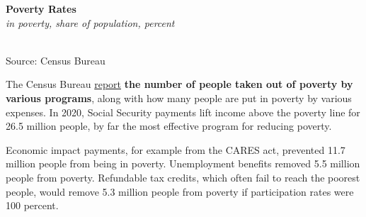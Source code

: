 \documentclass{report}
\makeatletter
\newcommand{\tbllink}[1]{\href{https://raw.githubusercontent.com/bdecon/US-chartbook/master/chartbook/data/#1}{\faTable}}
\newcommand*\short[1]{\expandafter\@gobbletwo\number\numexpr#1\relax}
\newcommand{\absnode}[3]{\node[below right, align=left] at (axis cs: #1,#2) {#3};}
\newcommand{\dateaxisticks}{
		date coordinates in=x, axis line style={draw=none},
		xmax={2023-02-15},
		max space between ticks=40,	    
		xtick={{1990-01-01}, {1992-01-01}, {1994-01-01}, 
			{1996-01-01}, {1998-01-01}, {2000-01-01}, 
			{2002-01-01}, {2004-01-01}, {2006-01-01},
			{2008-01-01}, {2010-01-01}, {2012-01-01}, {2014-01-01},
		    {2016-01-01}, {2018-01-01}, {2020-01-01}, {2022-01-01}, 
		    {2024-01-01}, {2026-01-01}},
		minor xtick={{1989-01-01}, {1991-01-01}, {1993-01-01},
			{1995-01-01}, {1997-01-01}, {1999-01-01}, 
			{2001-01-01}, {2003-01-01}, {2005-01-01}, {2007-01-01},
		    {2009-01-01}, {2011-01-01}, {2013-01-01}, {2015-01-01},
		    {2017-01-01}, {2019-01-01}, {2021-01-01}, {2023-01-01}, 
		    {2025-01-01}, {2027-01-01}},
		enlarge y limits={0.06}, enlarge x limits={0.01},
		}
\newcommand{\bbar}[2]{extra #1 ticks = {{#2}}, extra #1 tick labels = ,
		extra #1 tick style = {grid=major, grid style={thick, black!25}},}
\newcommand{\thickline}[4]{\addplot[ultra thick, no markers, color=#1] 
		table [x=#2, y=#3, col sep=comma] {#4};	}
\newcommand{\rbars}{
		\fill[color=black!10] (axis cs:{1990-07-01},\pgfkeysvalueof{/pgfplots/ymin}) rectangle 
			(axis cs:{1991-03-01}, \pgfkeysvalueof{/pgfplots/ymax});
		\fill[color=black!10] (axis cs:{2007-12-01},\pgfkeysvalueof{/pgfplots/ymin}) rectangle 
			(axis cs:{2009-07-01}, \pgfkeysvalueof{/pgfplots/ymax});
		\fill[color=black!10] (axis cs:{2001-03-01},\pgfkeysvalueof{/pgfplots/ymin}) rectangle 
			(axis cs:{2001-11-01}, \pgfkeysvalueof{/pgfplots/ymax});
		\fill[color=black!10] (axis cs:{2020-02-01},\pgfkeysvalueof{/pgfplots/ymin}) rectangle 
			(axis cs:{2020-05-01}, \pgfkeysvalueof{/pgfplots/ymax});}
\makeatother
\begin{document}
{\begin{minipage}{0.76\textwidth}
\small 
\vspace{1mm}

\normalsize \textbf{Poverty Rates}\\
\footnotesize{\textit{in poverty, share of population, percent}}\\
\hspace*{-2mm} \\
\footnotesize{Source: Census Bureau} \hfill \tbllink{poverty_opm_line.csv}
\end{minipage}
\newpage
\begin{minipage}{0.76\textwidth}
\small The Census Bureau \href{https://www.census.gov/library/publications/2021/demo/p60-275.html}{report} \textbf{the number of people taken out of poverty by various programs}, along with how many people are put in poverty by various expenses. In 2020, Social Security payments lift income above the poverty line for 26.5 million people, by far the most effective program for reducing poverty.

Economic impact payments, for example from the CARES act, prevented 11.7 million people from being in poverty. Unemployment benefits removed 5.5 million people from poverty. Refundable tax credits, which often fail to reach the poorest people, would remove 5.3 million people from poverty if participation rates were 100 percent. 


\end{minipage}}
\end{document}

